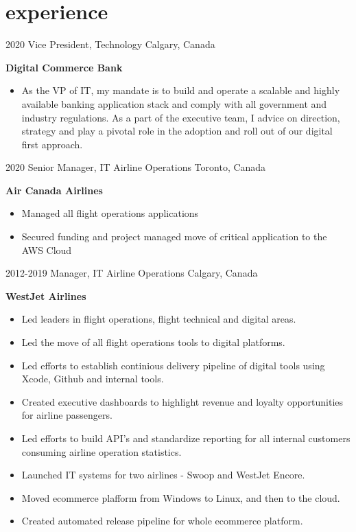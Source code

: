 \section{experience}

\begin{entrylist}
  \entry
    {2020}
    {Vice President, Technology}
    {Calgary, Canada}
    {
      \textbf{Digital Commerce Bank}
      \begin{itemize}
        \item As the VP of IT, my mandate is to build and operate a scalable and highly available banking application stack and comply with all government and industry regulations. As a part of the executive team, I advice on direction, strategy and play a pivotal role in the adoption and roll out of our digital first approach.
      \end{itemize}
    }
  \entry
    {2020}
    {Senior Manager, IT Airline Operations}
    {Toronto, Canada}
    {
      \textbf{Air Canada Airlines}
      \begin{itemize}
        \item Managed all flight operations applications 
	\item Secured funding and project managed move of critical application to the AWS Cloud 
      \end{itemize}
    }
  \entry
    {2012-2019}
    {Manager, IT Airline Operations}
    {Calgary, Canada}
    {
      \textbf{WestJet Airlines}
      \begin{itemize}
        \item Led leaders in flight operations, flight technical and digital areas. 
        \item Led the move of all flight operations tools to digital platforms.
        \item Led efforts to establish continious delivery pipeline of digital tools using Xcode, Github and internal tools. 
        \item Created executive dashboards to highlight revenue and loyalty opportunities for airline passengers.  
        \item Led efforts to build API's and standardize reporting for all internal customers consuming airline operation statistics. 
        \item Launched IT systems for two airlines - Swoop and WestJet Encore.
        \item Moved ecommerce plafform from Windows to Linux, and then to the cloud.
        \item Created automated release pipeline for whole ecommerce platform. 

\end{itemize}}
\end{entrylist}
